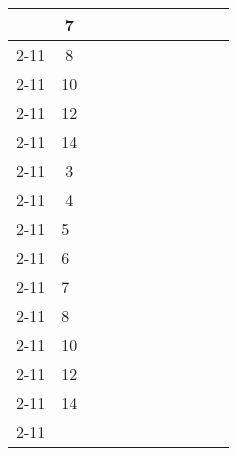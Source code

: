 \begin{table}[]
\begin{longtable}{c|c|l|l|l|l|l|l|l|l|l|}
                                            & 7                       &       &       &         &          &         &           &         &        &          \\ \cline{2-11} 
                                            & 8                       &       &       &         &          &         &           &         &        &          \\ \cline{2-11} 
                                            & 10                      &       &       &         &          &         &           &         &        &          \\ \cline{2-11} 
                                            & 12                      &       &       &         &          &         &           &         &        &          \\ \cline{2-11} 
                                            & 14                      &       &       &         &          &         &           &         &        &          \\ \cline{2-11} 
                                            & 3                       &       &       &         &          &         &           &         &        &          \\ \cline{2-11} 
                                            & 4                       &       &       &         &          &         &           &         &        &          \\ \cline{2-11} 
\multicolumn{1}{l|}{}                       & \multicolumn{1}{l|}{5}  &       &       &         &          &         &           &         &        &          \\ \cline{2-11} 
\multicolumn{1}{l|}{}                       & \multicolumn{1}{l|}{6}  &       &       &         &          &         &           &         &        &          \\ \cline{2-11} 
\multicolumn{1}{l|}{}                       & \multicolumn{1}{l|}{7}  &       &       &         &          &         &           &         &        &          \\ \cline{2-11} 
\multicolumn{1}{l|}{}                       & \multicolumn{1}{l|}{8}  &       &       &         &          &         &           &         &        &          \\ \cline{2-11} 
\multicolumn{1}{l|}{}                       & \multicolumn{1}{l|}{10} &       &       &         &          &         &           &         &        &          \\ \cline{2-11} 
\multicolumn{1}{l|}{}                       & \multicolumn{1}{l|}{12} &       &       &         &          &         &           &         &        &          \\ \cline{2-11} 
\multicolumn{1}{l|}{}                       & \multicolumn{1}{l|}{14} &       &       &         &          &         &           &         &        &          \\ \cline{2-11} 
\end{longtable}
\end{table}